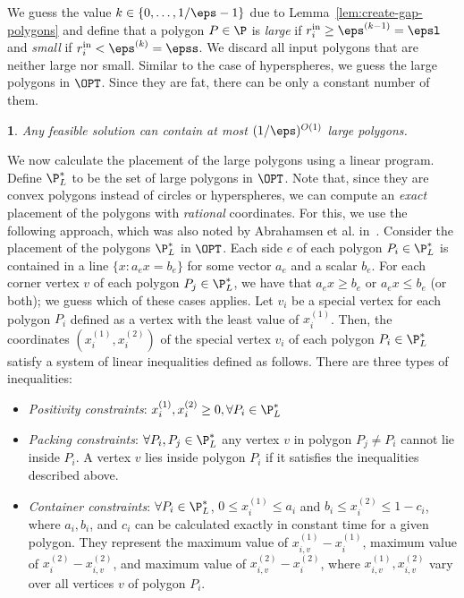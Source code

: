 \documentclass[10pt,a4paper]{article}
\theoremstyle{plain}
\theoremstyle{plain}
\theoremstyle{plain}
\newtheorem{prop}[theorem]{\protect\propositionname}
\theoremstyle{definition}
\providecommand{\propositionname}{Proposition}
\begin{document}
{We guess the value $k\in\{0,\ldots,1/\eps-1\}$ due to Lemma~\ref{lem:create-gap-polygons}
and define that a polygon $P\in\P$ is \emph{large }if $r_{i}^{\mathrm{in}}\ge \eps^{(k-1)}=\epsl$
and \emph{small }if $r_{i}^{\mathrm{in}}<\eps^{(k)}=\epss$. We discard
all input polygons that are neither large nor small.
Similar to the case of hyperspheres, we guess the large polygons in
$\OPT$. Since they are fat, there can be only a constant number of
them.

\begin{prop} 
	\label{prop: finite_circle}
	Any feasible solution can contain at most $(1/\eps)^{O(1)}$
	large polygons. \end{prop}

We now calculate the placement of the large polygons using a linear program. Define $\P_{L}^*$ to be the set of large polygons in $\OPT$.
Note that, since they are convex polygons instead of circles or hyperspheres, we can compute an \emph{exact }placement of the polygons with \emph{rational }coordinates.
For this, we use the following approach, which was also noted by Abrahamsen et al. in~\cite{abrahamsen2020framework}. Consider
the placement of the polygons $\P_{L}^{*}$ in $\OPT$. Each
side $e$ of each polygon $P_{i}\in\P_{L}^{*}$ is contained in a
line $\{x :a_{e}x=b_{e}\}$ for some vector $a_{e}$
and a scalar $b_{e}$. For each corner vertex $v$ of each polygon $P_{j}\in\P_{L}^{*}$,
we have that $a_{e}x\ge b_{e}$ or $a_{e}x\le b_{e}$ (or both); we
guess which of these cases applies. Let $v_{i}$ be a special vertex for each polygon $P_i$ defined as a vertex with the least value of $x_{i}^{(1)}$. Then, the coordinates
$({x}_{i}^{(1)},{x}_{i}^{(2)})$ of the special vertex $v_{i}$
of each polygon $P_{i}\in\P_{L}^{*}$ satisfy a system
of linear inequalities defined as follows.
There are three types of inequalities:
\begin{itemize}
	\item \emph{Positivity constraints}: $x_{i}^{(1)},x_{i}^{(2)} \ge0, \forall P_{i}\in\P_{L}^{*}\nonumber$
	
	\item \emph{Packing constraints}: $\forall P_{i},P_{j} \in \P_{L}^{*}$ any vertex $v$ in polygon $P_{j} \neq P_{i}$ cannot lie inside $P_{i}$. A vertex $v$ lies inside polygon $P_{i}$ if it satisfies the inequalities described above.
	
	\item \emph{Container constraints}:  $\forall P_{i}\in\P_{L}^{*}\nonumber$, $0 \leq x_{i}^{(1)} \leq a_i$ and $b_i \leq x_{i}^{(2)} \leq 1-c_i$, where $a_i, b_i$, and $c_i$ can be calculated exactly in constant time for a given polygon. They represent the maximum value of $x_{i,v}^{(1)}-x_{i}^{(1)}$, maximum value of $x_{i}^{(2)}-x_{i,v}^{(2)}$, and maximum value of $x_{i,v}^{(2)}-x_{i}^{(2)}$, where $x_{i,v}^{(1)},x_{i,v}^{(2)}$ vary over all vertices $v$ of polygon $P_{i}$.
	

\end{itemize}}
\end{document}
